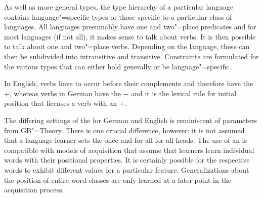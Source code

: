 As well as more general types, the type hierarchy of a particular language contains language"=specific types or those specific to a particular class
of languages. All languages presumably have one and two"=place predicates and for most languages (if not all), it makes sense to talk about verbs.
It is then possible to talk about one and two"=place verbs. Depending on the language, these can then be subdivided into intransitive and transitive.
Constraints are formulated for the various types that can either hold generally or be language"=specific.

In English, verbs have to occur before their complements and therefore have the
\initialv +, whereas verbs in German have the \initialv $-$ and it is the lexical rule for initial
position that licenses a verb with an \initialv +.

The differing settings of the \initialv for German and English is reminiscent of
parameters from GB"=Theory. There is one crucial difference,
however: it is not assumed that a language learner sets the \initialv once and for all for all
heads. The use of an \initialv is compatible with models of acquisition that assume that learners
learn individual words with their positional properties. It is certainly possible for the respective
words to exhibit different values for a particular feature. Generalizations about the position of
entire word classes are only learned at a later point in the acquisition process.

